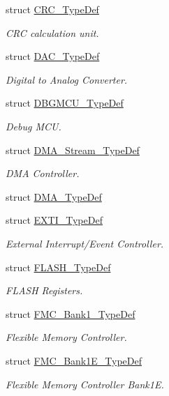 \begin{DoxyCompactItemize}
struct \mbox{\hyperlink{struct_c_r_c___type_def}{C\+R\+C\+\_\+\+Type\+Def}}
\begin{DoxyCompactList}\small\item\em C\+RC calculation unit. \end{DoxyCompactList}\item 
struct \mbox{\hyperlink{struct_d_a_c___type_def}{D\+A\+C\+\_\+\+Type\+Def}}
\begin{DoxyCompactList}\small\item\em Digital to Analog Converter. \end{DoxyCompactList}\item 
struct \mbox{\hyperlink{struct_d_b_g_m_c_u___type_def}{D\+B\+G\+M\+C\+U\+\_\+\+Type\+Def}}
\begin{DoxyCompactList}\small\item\em Debug M\+CU. \end{DoxyCompactList}\item 
struct \mbox{\hyperlink{struct_d_m_a___stream___type_def}{D\+M\+A\+\_\+\+Stream\+\_\+\+Type\+Def}}
\begin{DoxyCompactList}\small\item\em D\+MA Controller. \end{DoxyCompactList}\item 
struct \mbox{\hyperlink{struct_d_m_a___type_def}{D\+M\+A\+\_\+\+Type\+Def}}
\item 
struct \mbox{\hyperlink{struct_e_x_t_i___type_def}{E\+X\+T\+I\+\_\+\+Type\+Def}}
\begin{DoxyCompactList}\small\item\em External Interrupt/\+Event Controller. \end{DoxyCompactList}\item 
struct \mbox{\hyperlink{struct_f_l_a_s_h___type_def}{F\+L\+A\+S\+H\+\_\+\+Type\+Def}}
\begin{DoxyCompactList}\small\item\em F\+L\+A\+SH Registers. \end{DoxyCompactList}\item 
struct \mbox{\hyperlink{struct_f_m_c___bank1___type_def}{F\+M\+C\+\_\+\+Bank1\+\_\+\+Type\+Def}}
\begin{DoxyCompactList}\small\item\em Flexible Memory Controller. \end{DoxyCompactList}\item 
struct \mbox{\hyperlink{struct_f_m_c___bank1_e___type_def}{F\+M\+C\+\_\+\+Bank1\+E\+\_\+\+Type\+Def}}
\begin{DoxyCompactList}\small\item\em Flexible Memory Controller Bank1E. \end{DoxyCompactList}\item 

\end{DoxyCompactItemize}
